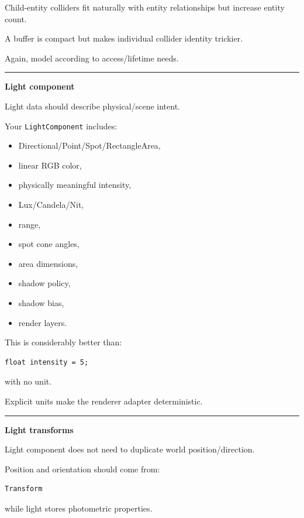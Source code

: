 Child-entity colliders fit naturally with entity relationships but increase entity count.

A buffer is compact but makes individual collider identity trickier.

Again, model according to access/lifetime needs.

\begin{center}\rule{0.5\linewidth}{0.5pt}\end{center}

\textbf{Light component}

Light data should describe physical/scene intent.

Your \texttt{LightComponent} includes:

\begin{itemize}
\tightlist
\item
  Directional/Point/Spot/RectangleArea,
\item
  linear RGB color,
\item
  physically meaningful intensity,
\item
  Lux/Candela/Nit,
\item
  range,
\item
  spot cone angles,
\item
  area dimensions,
\item
  shadow policy,
\item
  shadow bias,
\item
  render layers.
\end{itemize}

This is considerably better than:

\begin{verbatim}
float intensity = 5;
\end{verbatim}

with no unit.

Explicit units make the renderer adapter deterministic.

\begin{center}\rule{0.5\linewidth}{0.5pt}\end{center}

\textbf{Light transforms}

Light component does not need to duplicate world position/direction.

Position and orientation should come from:

\begin{verbatim}
Transform
\end{verbatim}

while light stores photometric properties.

